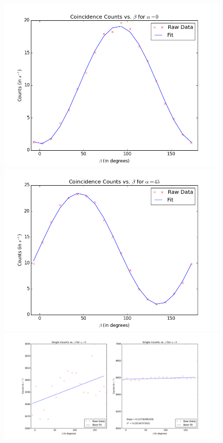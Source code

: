 \documentclass[10pt,a4paper]{article}
\begin{document}
\begin{figure}[H]
\centering
\includegraphics[scale=0.4]{../Analysis/alpha=0coinc.png}
\includegraphics[scale=0.4]{../Analysis/alpha=45coinc.png}
\includegraphics[scale=0.42]{../Analysis/alpha=0single.png}

\end{figure}
\end{document}
